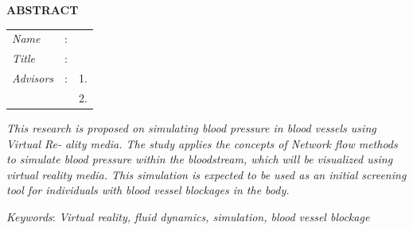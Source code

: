 \begin{center}
  \large\textbf{ABSTRACT}
\end{center}


\vspace{2ex}

\begingroup
\setlength{\tabcolsep}{0pt}

\noindent
\begin{tabularx}{\textwidth}{l >{\centering}m{3em} X}
  \emph{Name}     & : & \name{}         \\

  \emph{Title}    & : & \engtatitle{}   \\

  \emph{Advisors} & : & 1. \advisor{}   \\
                  &   & 2. \coadvisor{} \\
\end{tabularx}
\endgroup

\emph{This research is proposed on simulating blood pressure in blood vessels using Virtual Re- ality media. The study applies the concepts of Network flow methods to simulate blood pressure within the bloodstream, which will be visualized using virtual reality media. This simulation is expected to be used as an initial screening tool for individuals with blood vessel blockages in the body.
}

\emph{Keywords}: \emph{Virtual reality, fluid dynamics, simulation, blood vessel blockage}
